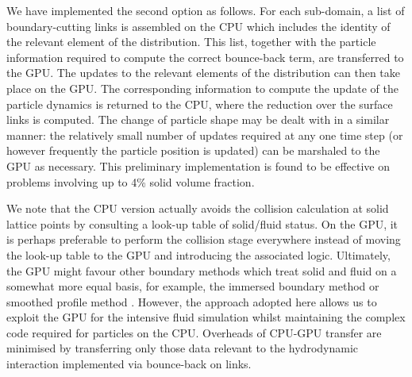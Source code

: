 We have implemented the second option as follows. For each sub-domain,
a list of boundary-cutting links is assembled on the CPU which includes
the identity of the relevant element of the distribution. This list,
together with the particle information required to compute the correct
bounce-back term, are transferred to the GPU. The updates to the relevant
elements of the distribution can then take place on the GPU. The
corresponding information to compute the update of the particle dynamics
is returned
to the CPU, where the reduction over the surface links is computed.
The change of particle shape may be dealt with in a similar manner:
the relatively small number of updates required at any one time step
(or however frequently the particle position is updated) can be
marshaled to the GPU as necessary. This preliminary implementation
is found to be effective on problems involving up to 4\%
solid volume fraction.

We note that the CPU version actually avoids the collision calculation
at solid lattice points by consulting a look-up table of solid/fluid
status. On the GPU, it is perhaps preferable to perform the collision
stage everywhere instead of moving the look-up table to the GPU and
introducing the associated logic.
Ultimately, the GPU might favour other boundary methods which treat solid and
fluid on a somewhat more equal basis, for example, the immersed boundary
method \cite{ch14:immersed,ch14:immersed-lb} or smoothed profile method
\cite{ch14:spm}.
However, the approach adopted here  allows us to exploit
the GPU for the intensive fluid simulation whilst maintaining the complex
code required for particles on the CPU. Overheads of CPU-GPU transfer are
minimised by transferring only those data relevant to the hydrodynamic
interaction implemented via bounce-back on links.


